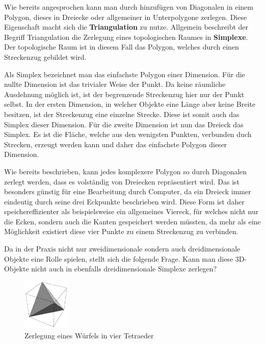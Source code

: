 Wie bereits angesprochen kann man durch hinzufügen von Diagonalen in einem Polygon, dieses in Dreiecke oder allgemeiner in Unterpolygone 
zerlegen. Diese Eigenschaft macht sich die \textbf{Triangulation} zu nutze. Allgemein beschreibt der Begriff Triangulation die Zerlegung eines 
topologischen Raumes in \textbf{Simplexe}.\cite{polytri3} Der topologische Raum ist in diesem Fall das Polygon, welches durch einen Streckenzug gebildet wird.

Als Simplex bezeichnet man das einfachste Polygon einer Dimension.\cite{simplex} Für die nullte Dimension ist das trivialer Weise der Punkt. Da keine räumliche Ausdehnung 
möglich ist, ist der begrenzende Streckenzug hier nur der Punkt selbst.
In der ersten Dimension, in welcher Objekte eine Länge aber keine Breite besitzen, ist der Streckenzug eine einzelne Strecke. Diese ist somit auch das Simplex dieser Dimension.
Für die zweite Dimension ist nun das Dreieck das Simplex. Es ist die Fläche, welche aus den wenigsten Punkten, verbunden duch Strecken, erzeugt werden kann und daher das einfachste Polygon dieser 
Dimension. 

Wie bereits beschrieben, kann jedes komplexere Polygon so durch Diagonalen zerlegt werden, dass es volständig von Dreiecken repräsentiert wird. Das ist besonders günstig für 
eine Bearbeitung durch Computer, da ein Dreieck immer eindeutig durch seine drei Eckpunkte beschrieben wird. Diese Form ist daher speichereffizienter als beispielsweise ein allgemeines Viereck, 
für welches nicht nur die Ecken, sondern auch die Kanten gespeichert werden müssten, da mehr als eine Möglichkeit existiert diese vier Punkte zu einem Streckenzug zu verbinden.

Da in der Praxis nicht nur zweidimensionale sondern auch dreidimensionale Objekte eine Rolle spielen, stellt sich die folgende Frage. Kann man diese 3D-Objekte nicht auch in ebenfalls dreidimensionale 
Simplexe zerlegen? 

\begin{figure}
  \centering
  \includegraphics[width=0.2\textwidth]{bilder/cube.png}
  \caption[Zerlegung eines Würfels in vier Tetraeder]{\centering Zerlegung eines Würfels in vier Tetraeder \cite{cubecut}}
  \label{fig:cubecut}
\end{figure}

